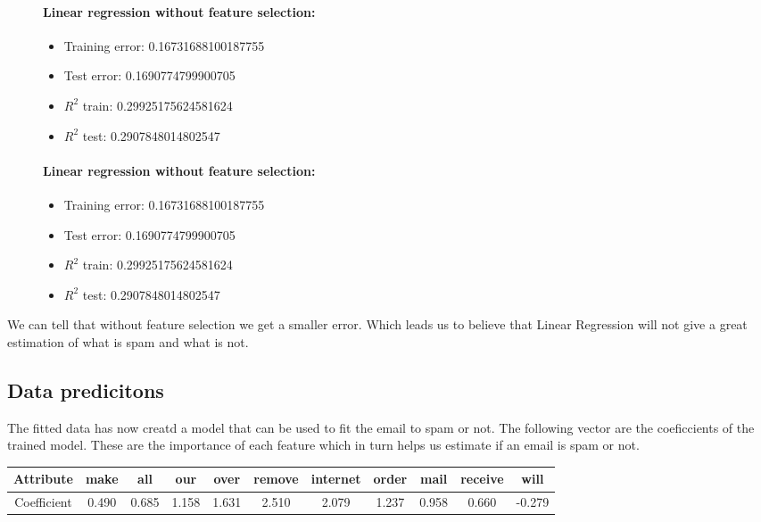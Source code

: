 \documentclass[10pt, paper=a4]{article}
\begin{document}
\begin{figure}[h]
  \begin{minipage}{0.4\textwidth}
    \paragraph{Linear regression without feature selection:}
    \begin{itemize}
    \item Training error: 0.16731688100187755
    \item Test error:     0.1690774799900705
    \item $R^2$ train:     0.29925175624581624
    \item $R^2$ test:     0.2907848014802547
    \end{itemize}
  \end{minipage} \hfill
  \begin{minipage}{0.4\textwidth}
    \paragraph{Linear regression without feature selection:}
    \begin{itemize}
    \item Training error: 0.16731688100187755
    \item Test error:     0.1690774799900705
    \item $R^2$ train:     0.29925175624581624
    \item $R^2$ test:     0.2907848014802547
    \end{itemize}
  \end{minipage} \vfill
\end{figure}

We can tell that without feature selection we get a smaller
error. Which leads us to believe that Linear Regression will not give
a great estimation of what is spam and what is not.

\subsection{Data predicitons}
The fitted data has now creatd a model that can be used to fit the
email to spam or not.  The following vector are the coeficcients of
the trained model. These are the importance of each feature which in
turn helps us estimate if an email is spam or not.
\begin{table}[h]
\centering
\begin{tabular}{c|c|c|c|c|c|c|c|c|c|c}
\hline Attribute & make & all & our & over & remove & internet & order
& mail & receive & will \\ \hline Coefficient & 0.490 & 0.685 & 1.158
& 1.631 & 2.510 & 2.079 & 1.237 & 0.958 & 0.660 & -0.279 \\ \hline
\end{tabular}
\end{table}
\end{document}
